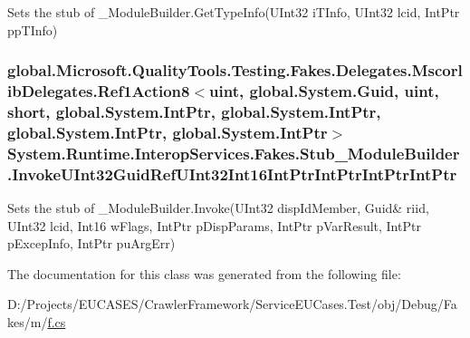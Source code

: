 Sets the stub of \-\_\-\-Module\-Builder.\-Get\-Type\-Info(\-U\-Int32 i\-T\-Info, U\-Int32 lcid, Int\-Ptr pp\-T\-Info)

\hypertarget{class_system_1_1_runtime_1_1_interop_services_1_1_fakes_1_1_stub___module_builder_a8dadb977b12eb0664c80ce4c0c3c3e47}{
\subsubsection[{Invoke\-U\-Int32\-Guid\-Ref\-U\-Int32\-Int16\-Int\-Ptr\-Int\-Ptr\-Int\-Ptr\-Int\-Ptr}]{\setlength{\rightskip}{0pt plus 5cm}global.\-Microsoft.\-Quality\-Tools.\-Testing.\-Fakes.\-Delegates.\-Mscorlib\-Delegates.\-Ref1\-Action8$<$uint, global.\-System.\-Guid, uint, short, global.\-System.\-Int\-Ptr, global.\-System.\-Int\-Ptr, global.\-System.\-Int\-Ptr, global.\-System.\-Int\-Ptr$>$ System.\-Runtime.\-Interop\-Services.\-Fakes.\-Stub\-\_\-\-Module\-Builder.\-Invoke\-U\-Int32\-Guid\-Ref\-U\-Int32\-Int16\-Int\-Ptr\-Int\-Ptr\-Int\-Ptr\-Int\-Ptr}}\label{class_system_1_1_runtime_1_1_interop_services_1_1_fakes_1_1_stub___module_builder_a8dadb977b12eb0664c80ce4c0c3c3e47}


Sets the stub of \-\_\-\-Module\-Builder.\-Invoke(U\-Int32 disp\-Id\-Member, Guid\& riid, U\-Int32 lcid, Int16 w\-Flags, Int\-Ptr p\-Disp\-Params, Int\-Ptr p\-Var\-Result, Int\-Ptr p\-Excep\-Info, Int\-Ptr pu\-Arg\-Err)



The documentation for this class was generated from the following file\-:\begin{DoxyCompactItemize}
\item 
D\-:/\-Projects/\-E\-U\-C\-A\-S\-E\-S/\-Crawler\-Framework/\-Service\-E\-U\-Cases.\-Test/obj/\-Debug/\-Fakes/m/\hyperlink{m_2f_8cs}{f.\-cs}\end{DoxyCompactItemize}
